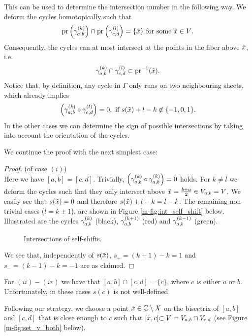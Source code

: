 \documentclass[main.tex]{subfiles}
\begin{document}
 This can be used to determine the intersection number in the following way. We deform the cycles homotopically
 such that
 \begin{equation*}
   \operatorname{pr}\left(\gamma_{a,b}^{(k)}\right) \cap \operatorname{pr}\left(\gamma_{c,d}^{(l)}\right) = \{ \tilde{x} \}  \text{ for some $\tilde{x} \in V$.} 
 \end{equation*}
 Consequently, the cycles can at most intersect at the
 points in the fiber above $\tilde{x}$, i.e.
 \begin{equation*}
  \gamma_{a,b}^{(k)} \cap \gamma_{c,d}^{(l)} \subset \operatorname{pr}^{-1}(\tilde{x}).
 \end{equation*}
 Notice that, by definition, any cycle in $\Gamma$ only runs on two neighbouring sheets, which already implies
 \begin{equation*}
   \left(\gamma_{a,b}^{(k)} \circ \gamma_{c,d}^{(l)}\right) = 0, \text{ if $s(\tilde{x})+l-k \not\in \{-1,0,1\}$.}
 \end{equation*}
  In the other cases we can determine the
  sign of possible intersections by taking into account the orientation of the cycles.
  
 We continue the proof with the next simplest case:
 \begin{proof}\let\qed\relax (of case $(i)$) \\
 Here we have $[a,b] = [c,d]$. Trivially, $\left( \gamma_{a,b}^{(k)} \circ \gamma_{a,b}^{(k)} \right) = 0$ holds. For $k \ne l$ we deform the cycles such that they only intersect above
 $\tilde{x} = \frac{b+a}{2} \in  V_{a,b}= V$.
  We easily see that $s(\tilde{x}) = 0$ and therefore $s(\tilde{x}) + l - k = l - k$. The remaining non-trivial cases
 ($l = k \pm 1$), are shown in Figure \ref{m-fig:int_self_shift} below.
   Illustrated are the cycles $\gamma_{a,b}^{(k)}$ (black),
      $\gamma_{a,b}^{(k+1)}$ (red) and $\gamma_{a,b}^{(k-1)}$ (green).
    \begin{figure}[H]
      \begin{center}
   \scalebox{0.8}{}
      \end{center}
    \caption{Intersections of self-shifts.}
    \label{fig:int_self_shift}
\end{figure}
  We see that, independently of $s(\tilde{x})$, $s_+ = (k+1)-k = 1$ and $s_- = (k-1)-k = -1$ are as claimed.
 \end{proof}

  For $(ii)-(iv)$ we have that $[a,b] \cap [c,d] = \{c \}$, where $c$ is either $a$ or $b$. Unfortunately, in these cases $s(c)$ is not
  well-defined.
  
 Following our strategy, we choose a point $\tilde{x} \in \mathbb{C} \setminus X$ on the bisectrix of
  $[a,b]$ and $[c,d]$ that is close enough to $c$ such that $[\tilde{x},c[ \subset V = V_{a,b} \cap V_{c,d}$
  (see Figure \ref{m-fig:set_v_both} below).
  
\end{document}
